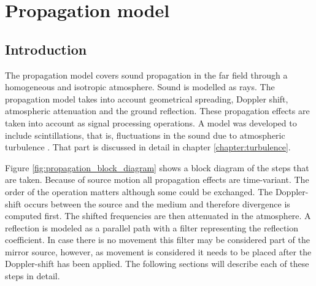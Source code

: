 \section{Propagation model}

\subsection{Introduction}
The propagation model covers sound propagation in the far field through a
homogeneous and isotropic atmosphere. Sound is modelled as rays. The propagation
model takes into account geometrical spreading, Doppler shift, atmospheric
attenuation and the ground reflection. These propagation effects are taken into
account as signal processing operations.
A model was developed to include scintillations, that is, fluctuations in the
sound due to atmospheric turbulence \cite{Rietdijk2017}. That part is discussed
in detail in chapter \ref{chapter:turbulence}.

Figure \ref{fig:propagation_block_diagram} shows a block diagram of the steps
that are taken. Because of source motion all propagation effects are
time-variant. The order of the operation matters although some could be
exchanged. The Doppler-shift occurs between the source and the medium and
therefore divergence is computed first. The shifted frequencies are then
attenuated in the atmosphere. A reflection is modeled as a parallel path with a
filter representing the reflection coefficient. In case there is no movement
this filter may be considered part of the mirror source, however, as movement is
considered it needs to be placed after the Doppler-shift has been applied. The
following sections will describe each of these steps in detail.


